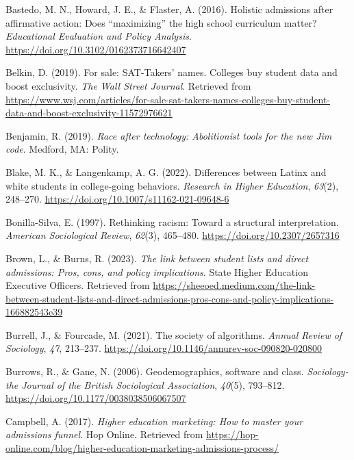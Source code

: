 \documentclass[
  12pt,
]{article}
\newlength{\cslhangindent}
\newlength{\cslentryspacingunit} %
\newenvironment{CSLReferences}[2] %
 {%
  \setlength{\parindent}{0pt}
  \ifodd #1
  \let\oldpar\par
  \def\par{\hangindent=\cslhangindent\oldpar}
  \fi
  \setlength{\parskip}{#2\cslentryspacingunit}
 }%
 {}
\begin{document}
\begin{CSLReferences}{1}{0}
\leavevmode{}%
Bastedo, M. N., Howard, J. E., \& Flaster, A. (2016). Holistic admissions after affirmative action: Does {``maximizing''} the high school curriculum matter? \emph{Educational Evaluation and Policy Analysis}. \url{https://doi.org/10.3102/0162373716642407}

\leavevmode{}%
Belkin, D. (2019). For sale: {SAT}-{Takers}' names. {Colleges} buy student data and boost exclusivity. \emph{The Wall Street Journal}. Retrieved from \url{https://www.wsj.com/articles/for-sale-sat-takers-names-colleges-buy-student-data-and-boost-exclusivity-11572976621}

\leavevmode{}%
Benjamin, R. (2019). \emph{Race after technology: Abolitionist tools for the new {J}im {c}ode}. Medford, MA: Polity.

\leavevmode{}%
Blake, M. K., \& Langenkamp, A. G. (2022). Differences between {L}atinx and white students in college-going behaviors. \emph{Research in Higher Education}, \emph{63}(2), 248--270. \url{https://doi.org/10.1007/s11162-021-09648-6}

\leavevmode{}%
Bonilla-Silva, E. (1997). Rethinking racism: Toward a structural interpretation. \emph{American Sociological Review}, \emph{62}(3), 465--480. \url{https://doi.org/10.2307/2657316}

\leavevmode{}%
Brown, L., \& Burns, R. (2023). \emph{The link between student lists and direct admissions: Pros, cons, and policy implications}. {State Higher Education Executive Officers}. Retrieved from \url{https://sheeoed.medium.com/the-link-between-student-lists-and-direct-admissions-pros-cons-and-policy-implications-166882543e39}

\leavevmode{}%
Burrell, J., \& Fourcade, M. (2021). The society of algorithms. \emph{Annual Review of Sociology}, \emph{47}, 213--237. \url{https://doi.org/10.1146/annurev-soc-090820-020800}

\leavevmode{}%
Burrows, R., \& Gane, N. (2006). Geodemographics, software and class. \emph{Sociology-the Journal of the British Sociological Association}, \emph{40}(5), 793--812. \url{https://doi.org/10.1177/0038038506067507}

\leavevmode{}%
Campbell, A. (2017). \emph{Higher education marketing: {How} to master your admissions funnel}. Hop Online. Retrieved from \url{https://hop-online.com/blog/higher-education-marketing-admissions-process/}


\end{CSLReferences}
\end{document}
